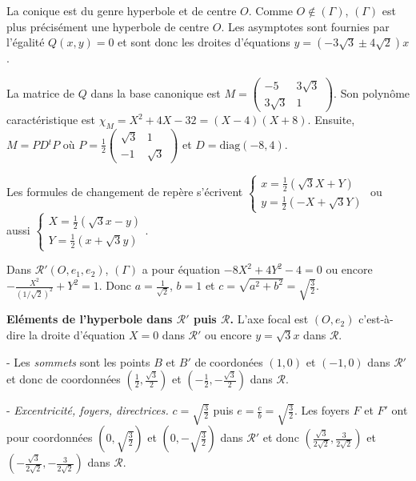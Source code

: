 {\begin{enumerate}
{La conique est du genre hyperbole et de centre $O$. Comme $O\notin(\Gamma)$, $(\Gamma)$ est plus précisément une hyperbole de centre $O$.
Les asymptotes sont fournies par l'égalité $Q(x,y)=0$ et sont donc les droites d'équations $y=(-3\sqrt{3}\pm4\sqrt{2})x$.

La matrice de $Q$ dans la base canonique est $M=\left(
\begin{array}{cc}
-5&3\sqrt{3}\\
3\sqrt{3}&1
\end{array}
\right)$. Son polynôme caractéristique est $\chi_M=X^2+4X-32 = (X-4)(X+8)$. Ensuite, $M = PD{^t}P $ où $P=\frac{1}{2}\left(
\begin{array}{cc}
\sqrt{3}&1\\
-1&\sqrt{3}
\end{array}
\right)$ et $D =\text{diag}(-8,4)$.

Les formules de changement de repère s'écrivent $\left\{
\begin{array}{l}
x=\frac{1}{2}(\sqrt{3}X+Y)\\
y=\frac{1}{2}(-X+\sqrt{3}Y)
\end{array}
\right.$ ou aussi $\left\{
\begin{array}{l}
X=\frac{1}{2}(\sqrt{3}x-y)\\
Y=\frac{1}{2}(x+\sqrt{3}y)
\end{array}
\right.$.

Dans $\mathcal{R}'(O,e_1,e_2)$, $(\Gamma)$ a pour équation $-8X^2+4Y^2-4=0$ ou encore $-\frac{X^2}{(1/\sqrt{2})^2}+Y^2 = 1$. Donc $a=\frac{1}{\sqrt{2}}$, $b=1$ et $c=\sqrt{a^2+b^2}=\sqrt{\frac{3}{2}}$. 

\textbf{Eléments de l'hyperbole dans $\mathcal{R}'$ puis $\mathcal{R}$.} L'axe focal est $(O,e_2)$ c'est-à-dire la droite d'équation $X=0$ dans $\mathcal{R}'$ ou encore $y=\sqrt{3}x$ dans $\mathcal{R}$.

- Les \emph{sommets} sont les points $B$ et $B'$ de coordonées $(1,0)$ et $(-1,0)$ dans $\mathcal{R}'$ et donc de coordonnées $\left(\frac {1}{2},\frac{\sqrt{3}}{2}\right)$ et $\left(-\frac {1}{2},-\frac{\sqrt{3}}{2}\right)$ dans $\mathcal{R}$.

- \emph{Excentricité, foyers, directrices.} $c=\sqrt{\frac{3}{2}}$ puis $e=\frac{c}{b}=\sqrt{\frac{3}{2}}$. Les foyers $F$ et $F'$ ont pour coordonnées $\left(0,\sqrt{\frac{3}{2}}\right)$ et  $\left(0,-\sqrt{\frac{3}{2}}\right)$ dans $\mathcal{R}'$ et donc $\left(\frac{\sqrt{3}}{2\sqrt{2}},\frac{3}{2\sqrt{2}}\right)$ et  $\left(-\frac{\sqrt{3}}{2\sqrt{2}},-\frac{3}{2\sqrt{2}}\right)$ dans $\mathcal{R}$.

}
\end{enumerate}}
